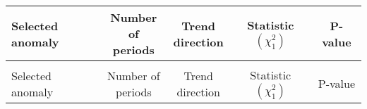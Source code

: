 \documentclass[
]{krantz}
\begin{document}
\begin{longtable}[t]{>{\raggedright\arraybackslash}p{4cm}cccc}
\toprule
Selected anomaly & \makecell[c]{Number of\\ periods} & \makecell[c]{Trend \\ direction} & \makecell[c]{Statistic \\ $\left(\chi^{2}_{1}\right)$} & P-value\\
\midrule
\endfirsthead
\multicolumn{5}{@{}l}{\textit{(continued)}}\\
\toprule
Selected anomaly & \makecell[c]{Number of\\ periods} & \makecell[c]{Trend \\ direction} & \makecell[c]{Statistic \\ $\left(\chi^{2}_{1}\right)$} & P-value\\
\midrule
\endhead


\end{longtable}
\end{document}
